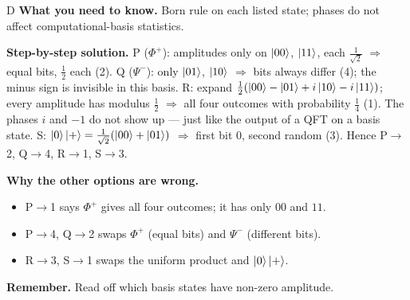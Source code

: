 \documentclass[11pt,a4paper]{article}
\newcommand{\qsep}{\par\vspace{2pt}{\color{black!15}\hrule}\vspace{4pt}}
\begin{document}
\begin{solbox}{D}
\textbf{\color{brand}What you need to know.} Born rule on each listed state; phases do not affect computational-basis statistics.

\textbf{\color{brand}Step-by-step solution.} P ($\Phi^+$): amplitudes only on $\ket{00}$, $\ket{11}$, each $\frac{1}{\sqrt2}$ $\Rightarrow$ equal bits, $\frac12$ each (2).
Q ($\Psi^-$): only $\ket{01}$, $\ket{10}$ $\Rightarrow$ bits always differ (4); the minus sign is invisible in this basis.
R: expand $\frac12(\ket{00} - \ket{01} + i\ket{10} - i\ket{11})$; every amplitude has modulus $\frac12$ $\Rightarrow$ all four outcomes
with probability $\frac14$ (1). The phases $i$ and $-1$ do not show up --- just like the output of a QFT on a basis state.
S: $\ket0\ket{+} = \frac{1}{\sqrt2}(\ket{00} + \ket{01})$ $\Rightarrow$ first bit 0, second random (3).
Hence P$\to$2, Q$\to$4, R$\to$1, S$\to$3.

\textbf{\color{brand}Why the other options are wrong.}
\begin{itemize}[leftmargin=2.4em, itemsep=1pt, topsep=2pt]
\item[\textbf{(A)}] P$\to$1 says $\Phi^+$ gives all four outcomes; it has only $00$ and $11$.
\item[\textbf{(B)}] P$\to$4, Q$\to$2 swaps $\Phi^+$ (equal bits) and $\Psi^-$ (different bits).
\item[\textbf{(C)}] R$\to$3, S$\to$1 swaps the uniform product and $\ket0\ket+$.
\end{itemize}
\textbf{\color{brand}Remember.} Read off which basis states have non-zero amplitude.
\end{solbox}
\qsep
\end{document}
